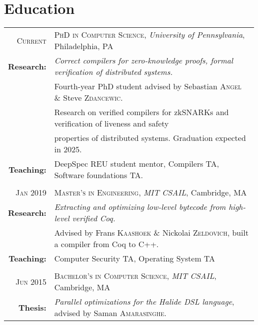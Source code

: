 \documentclass[lettersize,11pt]{article}
\begin{document}
\section{Education}
\begin{tabular}{rl}
\textsc{Current} & \textsc{PhD in Computer Science}, \emph{University of Pennsylvania}, Philadelphia, PA\\
\textbf{Research:} & \emph{Correct compilers for zero-knowledge proofs, formal verification of distributed systems.}\\
& Fourth-year PhD student advised by Sebastian \textsc{Angel} \& Steve \textsc{Zdancewic}. \\
& Research on verified compilers for zkSNARKs and verification of liveness and safety \\
& properties of distributed systems. Graduation expected in 2025. \\
\textbf{Teaching:} & DeepSpec REU student mentor, Compilers TA, Software foundations TA. \\
 & \\[-0.5em]
\textsc{Jan} 2019 & \textsc{Master's in Engineering}, \emph{MIT} \emph{CSAIL}, Cambridge, MA\\
\textbf{Research:} & \emph{Extracting and optimizing low-level bytecode from high-level verified Coq.}\\
& Advised by Frans \textsc{Kaashoek} \& Nickolai \textsc{Zeldovich}, built a compiler from Coq to C++. \\
\textbf{Teaching:} & Computer Security TA, Operating System TA \\
 & \\[-0.5em]
\textsc{Jun} 2015 & \textsc{Bachelor's in Computer Science}, \emph{MIT} \emph{CSAIL}, Cambridge, MA\\
\textbf{Thesis:} & \emph{Parallel optimizations for the Halide DSL language}, advised by Saman \textsc{Amarasinghe}. \\
\end{tabular}
\end{document}
